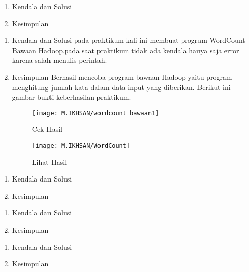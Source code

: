 \begin{enumerate}
\item Kendala dan Solusi


\item Kesimpulan

\end{enumerate}

\begin{enumerate}
\item Kendala dan Solusi
\newline pada praktikum kali ini membuat program WordCount Bawaan Hadoop.pada saat praktikum tidak ada kendala hanya saja error karena salah menulis perintah.

\item Kesimpulan
Berhasil mencoba program bawaan Hadoop yaitu program menghitung jumlah kata dalam data input yang diberikan. Berikut ini gambar bukti keberhasilan praktikum.

\begin{figure}[!ht]
\texttt{[image: M.IKHSAN/wordcount bawaan1]}
\caption{Cek Hasil}
\label{gam:Hadoop-version(M.IKHSAN)}
\end{figure}

\begin{figure}[!ht]
\texttt{[image: M.IKHSAN/WordCount]}
\caption{Lihat Hasil}
\label{gam:Hadoop-version(M.IKHSAN)}
\end{figure}

\end{enumerate}

\clearpage
{}
\begin{enumerate}
\item Kendala dan Solusi

\item Kesimpulan

\end{enumerate}

\begin{enumerate}
\item Kendala dan Solusi

\item Kesimpulan

\end{enumerate}

\begin{enumerate}
\item Kendala dan Solusi

\item Kesimpulan

\end{enumerate}